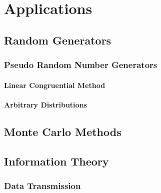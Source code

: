 \section{Applications}

\subsection{Random Generators}

\subsubsection{Pseudo Random Number Generators}

\paragraph{Linear Congruential Method}




\paragraph{Arbitrary Distributions}




\subsection{Monte Carlo Methods}


\subsection{Information Theory}


\subsubsection{Data Transmission}

